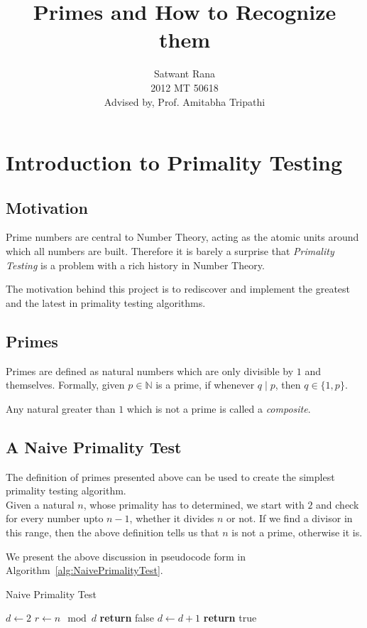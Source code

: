 \documentclass[11pt]{report}
\title{\textbf{Primes and How to Recognize them}}
\author{Satwant Rana\\
		2012 MT 50618\\
		Advised by, Prof. Amitabha Tripathi}
\date{}
\begin{document}
\maketitle

\tableofcontents{}

\chapter{Introduction to Primality Testing}
\section{Motivation}

Prime numbers are central to Number Theory, acting as the atomic units around which all numbers are built. Therefore it is barely a surprise that \emph{Primality Testing} is a problem with a rich history in Number Theory. 

The motivation behind this project is to rediscover and implement the greatest and the latest in primality testing algorithms.

\section{Primes}

Primes are defined as natural numbers which are only divisible by $1$ and themselves. Formally, given $p \in \mathbb{N}$ is a prime, if whenever $q \mid p$, then $q \in \{1, p\}$.

Any natural greater than $1$ which is not a prime is called a \emph{composite}.

\section{A Naive Primality Test}

The definition of primes presented above can be used to create the simplest primality testing algorithm.\\ Given a natural $n$, whose primality has to determined, we start with $2$ and check for every number upto $n-1$, whether it divides $n$ or not. If we find a divisor in this range, then the above definition tells us that $n$ is not a prime, otherwise it is.

We present the above discussion in pseudocode form in Algorithm~\ref{alg:NaivePrimalityTest}.

\begin{algorithm}
\caption{Naive Primality Test}
\label{alg:NaivePrimalityTest}
\begin{algorithmic}
\State $d\gets 2$
\State $r \gets n \mod d$
	\State \textbf{return} false 
\EndIf
\State $d \gets d+1$
\EndWhile
\State \textbf{return} true 
\EndProcedure
\end{algorithmic}
\end{algorithm}
\end{document}
